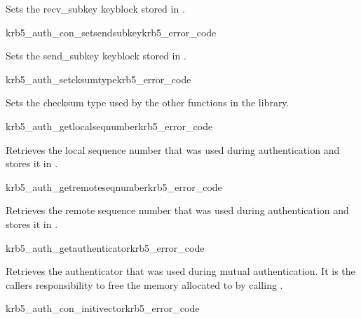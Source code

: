 Sets the recv\_subkey keyblock stored in .

\begin{funcdecl}{krb5_auth_con_setsendsubkey}{krb5_error_code}{\funcinout}
\funcout
{}
\end{funcdecl}

Sets the send\_subkey keyblock stored in .

\begin{funcdecl}{krb5_auth_setcksumtype}{krb5_error_code}{\funcinout}
\funcin
{}
\end{funcdecl}

Sets the checksum type used by the other functions in the library. 

\begin{funcdecl}{krb5_auth_getlocalseqnumber}{krb5_error_code}{\funcinout}
\funcin
{}
\end{funcdecl}

Retrieves the local sequence number that was used during authentication
and stores it in .

\begin{funcdecl}{krb5_auth_getremoteseqnumber}{krb5_error_code}{\funcinout}
\funcin
{}
\end{funcdecl}

Retrieves the remote sequence number that was used during authentication
and stores it in .

\begin{funcdecl}{krb5_auth_getauthenticator}{krb5_error_code}{\funcinout}
\funcout
{}
\end{funcdecl}

Retrieves the authenticator that was used during mutual
authentication. It is the callers responsibility to free the memory
allocated to  by calling
. 

\begin{funcdecl}{krb5_auth_con_initivector}{krb5_error_code}{\funcinout}
\end{funcdecl}


